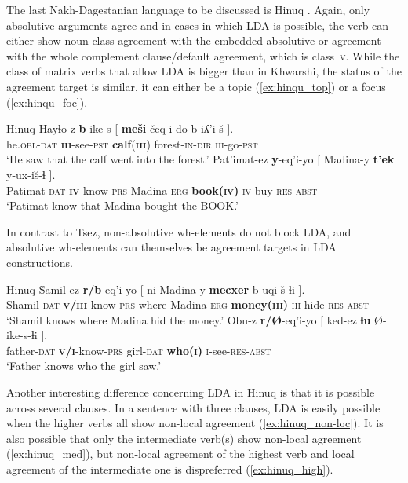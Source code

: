 \documentclass[output=paper
,modfonts
,nonflat]{langsci/langscibook}
\begin{document}
The last Nakh-Dagestanian language to be discussed is Hinuq \citep{Forker2012}. Again, only absolutive arguments agree and in cases in which LDA is possible, the verb can either show noun class agreement with the embedded absolutive or agreement with the whole complement clause/default agreement, which is class~\textsc{v}. While the class of matrix verbs that allow LDA is bigger than in Khwarshi, the status of the agreement target is similar, it can either be a topic (\ref{ex:hinqu_top}) or a focus (\ref{ex:hinqu_foc}).
\begin{exe}
\ex Hinuq \citep[][628]{Forker2012}
	\xlist
	\ex \label{ex:hinqu_top}
		\gll Hayɬo-z \textbf{b}-ike-s [ \textbf{me\v{s}i} \v{c}eq-i-do b-iʎ'i-\v{s} ].\\
			 he.\textsc{obl}-\textsc{dat} \textbf{\textsc{iii}}-see-\textsc{pst} {} \textbf{calf}(\textbf{\textsc{iii}}) forest-\textsc{in}-\textsc{dir} \textsc{iii}-go-\textsc{pst}\\
		\glt `He saw that the calf went into the forest.' 
	\ex  \label{ex:hinqu_foc}
		\gll Pat'imat-ez \textbf{y}-eq'i-yo [ Madina-y \textbf{t'ek} y-ux-i\u{s}-ɬ ].\\
			 Patimat-\textsc{dat} \textbf{\textsc{iv}}-know-\textsc{prs} {} Madina-\textsc{erg} \textbf{book(\textsc{iv})} \textsc{iv}-buy-\textsc{res-abst}\\
		\glt `Patimat know that Madina bought the BOOK.'
	\endxlist
\end{exe}
In contrast to Tsez, non-absolutive wh-elements do not block LDA, and absolutive wh-elements can themselves be agreement targets in LDA constructions.
\begin{exe}
\ex Hinuq \citep[][637]{Forker2012}
	\xlist
	\ex
		\gll \u{S}amil-ez \textbf{r/b}-eq'i-yo [ ni Madina-y \textbf{mecxer} b-uqi-\u{s}-ɬi ].\\
			 Shamil-\textsc{dat} \textbf{\textsc{v/iii}}-know-\textsc{prs} {} where Madina-\textsc{erg} \textbf{money(\textsc{iii})} \textsc{iii}-hide-\textsc{res-abst}\\
		\glt `Shamil knows where Madina hid the money.'
	\ex 
		\gll Obu-z \textbf{r/\O{}}-eq'i-yo [ ked-ez \textbf{ɬu} \O{}-ike-s-ɬi ].\\
			 father-\textsc{dat} \textbf{\textsc{v/i}}-know-\textsc{prs} {} girl-\textsc{dat} \textbf{who(\textsc{i})} \textsc{i}-see-\textsc{res-abst}\\
		\glt `Father knows who the girl saw.'
	\endxlist
\end{exe}
Another interesting difference concerning LDA in Hinuq is that it is possible across several clauses. In a sentence with three clauses, LDA is easily possible when the higher verbs all show non-local agreement (\ref{ex:hinuq_non-loc}). It is also possible that only the intermediate verb(s) show non-local agreement (\ref{ex:hinuq_med}), but non-local agreement of the highest verb and local agreement of the intermediate one is dispreferred (\ref{ex:hinuq_high}).\largerpage
\end{document}
